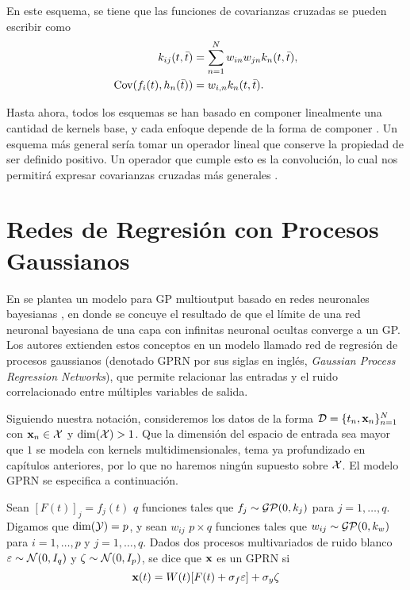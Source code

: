En este esquema, se tiene que las funciones de covarianzas cruzadas se pueden escribir como
\begin{align*}
	k_{ij}(t, \bar{t})				&= \sum_{n=1}^{N} w_{in} w_{jn} k_{n}(t, \bar{t}), \\
	\operatorname{Cov}(f_{i}(t), h_{n}(\bar{t}))	&= w_{i,n} k_{n}(t, \bar{t}).
\end{align*}

Hasta ahora, todos los esquemas se han basado en componer linealmente una cantidad de kernels base, y cada enfoque depende de la forma de componer . Un esquema más general sería tomar un operador lineal que conserve la
propiedad de ser definido positivo. Un operador que cumple esto es la convolución, lo cual nos permitirá expresar covarianzas cruzadas más generales .

\section{Redes de Regresión con Procesos Gaussianos}

En \cite{45} se plantea un modelo para GP multioutput basado en redes neuronales bayesianas \cite{55}, en donde se concuye el resultado de que el límite de una red neuronal bayesiana de una capa con infinitas neuronal ocultas converge a un GP. Los autores extienden estos conceptos en un modelo llamado red de regresión de procesos gaussianos (denotado GPRN por sus siglas en inglés, \emph{Gaussian Process Regression Networks}), que permite relacionar las entradas y el ruido correlacionado entre múltiples variables de salida.

Siguiendo nuestra notación, consideremos los datos de la forma \(\mathcal{D} = \{t_{n}, \mathbf{x}_{n}\}_{n=1}^{N}\) con \(\mathbf{x}_{n} \in \mathcal{X}\) y \(\dim(\mathcal{X}) > 1\). Que la dimensión del espacio de entrada sea mayor que \(1\) se modela con kernels multidimensionales, tema ya profundizado en capítulos anteriores, por lo que no haremos ningún supuesto sobre \(\mathcal{X}\). El modelo GPRN se especifica a continuación.

\begin{definition}
	Sean \([F(t)]_{j} = f_{j}(t)\) \(q\) funciones tales que \(f_{j} \sim \operatorname{\mathcal{GP}} (0, k_{j})\) para \(j = 1, \dotsc, q\). Digamos que \(\dim(\mathcal{Y}) = p\), y sean \(w_{ij}\) \(p \times q\) funciones tales que \(w_{ij} \sim \operatorname{\mathcal{GP}} (0, k_{w})\) para \(i = 1, \dotsc, p\) y \(j = 1, \dotsc, q\). Dados dos procesos multivariados de ruido blanco \(\varepsilon \sim \mathcal{N}(0, I_{q})\) y \(\zeta \sim \mathcal{N}(0, I_{p})\), se dice que \(\mathbf{x}\) es un GPRN si
	\begin{equation*}
	\mathbf{x}(t) = W(t) [F(t) + \sigma_{f} \varepsilon] + \sigma_{y}\zeta
	\end{equation*}
\end{definition}

